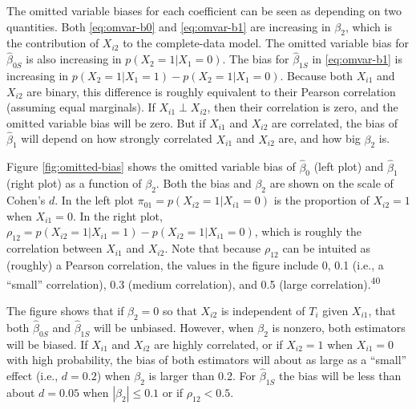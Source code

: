 \documentclass[
]{article}
\begin{document}
The omitted variable biases for each coefficient can be seen as depending on two quantities.
Both \eqref{eq:omvar-b0} and \eqref{eq:omvar-b1} are increasing in \(\beta_2\), which is the contribution of \(X_{i2}\) to the complete-data model.
The omitted variable bias for \(\hat{\beta}_{0S}\) is also increasing in \(p(X_2 = 1 | X_1 = 0)\).
The bias for \(\hat{\beta}_{1S}\) in \eqref{eq:omvar-b1} is increasing in \(p(X_2 = 1 | X_1 = 1) - p(X_2 = 1 | X_1 = 0)\).
Because both \(X_{i1}\) and \(X_{i2}\) are binary, this difference is roughly equivalent to their Pearson correlation (assuming equal marginals).
If \(X_{i1} \perp X_{i2}\), then their correlation is zero, and the omitted variable bias will be zero.
But if \(X_{i1}\) and \(X_{i2}\) are correlated, the bias of \(\hat{\beta}_1\) will depend on how strongly correlated \(X_{i1}\) and \(X_{i2}\) are, and how big \(\beta_2\) is.

Figure \ref{fig:omitted-bias} shows the omitted variable bias of \(\hat{\beta}_0\) (left plot) and \(\hat{\beta}_1\) (right plot) as a function of \(\beta_2\).
Both the bias and \(\beta_2\) are shown on the scale of Cohen's \(d\).
In the left plot \(\pi_{01} = p(X_{i2} = 1 | X_{i1} = 0)\) is the proportion of \(X_{i2} = 1\) when \(X_{i1} = 0\).
In the right plot, \(\rho_{12} = p(X_{i2} = 1 | X_{i1} = 1) - p(X_{i2} = 1 | X_{i1} = 0)\), which is roughly the correlation between \(X_{i1}\) and \(X_{i2}\).
Note that because \(\rho_{12}\) can be intuited as (roughly) a Pearson correlation, the values in the figure include 0, 0.1 (i.e., a ``small'' correlation), 0.3 (medium correlation), and 0.5 (large correlation).\textsuperscript{40}

The figure shows that if \(\beta_2 = 0\) so that \(X_{i2}\) is independent of \(T_i\) given \(X_{i1}\), that both \(\hat{\beta}_{0S}\) and \(\hat{\beta}_{1S}\) will be unbiased.
However, when \(\beta_2\) is nonzero, both estimators will be biased.
If \(X_{i1}\) and \(X_{i2}\) are highly correlated, or if \(X_{i2} = 1\) when \(X_{i1} = 0\) with high probability, the bias of both estimators will about as large as a ``small'' effect (i.e., \(d = 0.2\)) when \(\beta_2\) is larger than 0.2.
For \(\hat{\beta}_{1S}\) the bias will be less than about \(d = 0.05\) when \(|\beta_2| \leq 0.1\) or if \(\rho_{12} < 0.5\).
\end{document}
